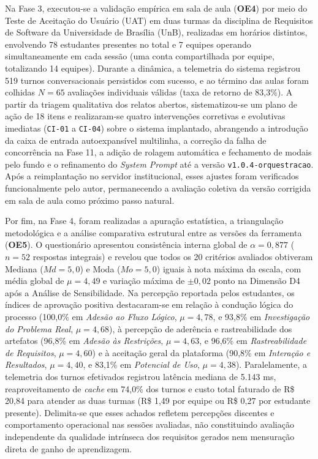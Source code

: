 Na Fase 3, executou-se a validação empírica em sala de aula (\textbf{OE4}) por meio do Teste de Aceitação do Usuário (UAT) em duas turmas da disciplina de Requisitos de Software da Universidade de Brasília (UnB), realizadas em horários distintos, envolvendo 78 estudantes presentes no total e 7 equipes operando simultaneamente em cada sessão (uma conta compartilhada por equipe, totalizando 14 equipes). Durante a dinâmica, a telemetria do sistema registrou 519 turnos conversacionais persistidos com sucesso, e ao término das aulas foram colhidas $N = 65$ avaliações individuais válidas (taxa de retorno de 83,3\%). A partir da triagem qualitativa dos relatos abertos, sistematizou-se um plano de ação de 18 itens e realizaram-se quatro intervenções corretivas e evolutivas imediatas (\texttt{CI-01} a \texttt{CI-04}) sobre o sistema implantado, abrangendo a introdução da caixa de entrada autoexpansível multilinha, a correção da falha de concorrência na Fase 11, a adição de rolagem automática e fechamento de modais pelo fundo e o refinamento do \textit{System Prompt} até a versão \texttt{v1.0.4-orquestracao}. Após a reimplantação no servidor institucional, esses ajustes foram verificados funcionalmente pelo autor, permanecendo a avaliação coletiva da versão corrigida em sala de aula como próximo passo natural.

Por fim, na Fase 4, foram realizadas a apuração estatística, a triangulação metodológica e a análise comparativa estrutural entre as versões da ferramenta (\textbf{OE5}). O questionário apresentou consistência interna global de $\alpha = 0,877$ ($n = 52$ respostas integrais) e revelou que todos os 20 critérios avaliados obtiveram Mediana ($Md = 5,0$) e Moda ($Mo = 5,0$) iguais à nota máxima da escala, com média global de $\mu = 4,49$ e variação máxima de $\pm 0,02$ ponto na Dimensão D4 após a Análise de Sensibilidade. Na percepção reportada pelos estudantes, os índices de aprovação positiva destacaram-se em relação à condução lógica do processo (100,0\% em \textit{Adesão ao Fluxo Lógico}, $\mu = 4,78$, e 93,8\% em \textit{Investigação do Problema Real}, $\mu = 4,68$), à percepção de aderência e rastreabilidade dos artefatos (96,8\% em \textit{Adesão às Restrições}, $\mu = 4,63$, e 96,6\% em \textit{Rastreabilidade de Requisitos}, $\mu = 4,60$) e à aceitação geral da plataforma (90,8\% em \textit{Interação e Resultados}, $\mu = 4,40$, e 83,1\% em \textit{Potencial de Uso}, $\mu = 4,38$). Paralelamente, a telemetria dos turnos efetivados registrou latência mediana de 5.143 ms, reaproveitamento de \textit{cache} em 74,0\% dos turnos e custo total faturado de R\$ 20,84 para atender as duas turmas (R\$ 1,49 por equipe ou R\$ 0,27 por estudante presente). Delimita-se que esses achados refletem percepções discentes e comportamento operacional nas sessões avaliadas, não constituindo avaliação independente da qualidade intrínseca dos requisitos gerados nem mensuração direta de ganho de aprendizagem.

